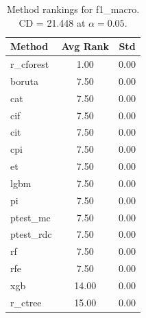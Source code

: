 \begin{table}[h]
\centering
\caption{Method rankings for f1_macro. CD = 21.448 at $\alpha=0.05$.}
\label{tab:ranks_f1_macro}
\begin{tabular}{lcc}
\toprule
Method & Avg Rank & Std \\
\midrule
r_cforest & 1.00 & 0.00 \\
boruta & 7.50 & 0.00 \\
cat & 7.50 & 0.00 \\
cif & 7.50 & 0.00 \\
cit & 7.50 & 0.00 \\
cpi & 7.50 & 0.00 \\
et & 7.50 & 0.00 \\
lgbm & 7.50 & 0.00 \\
pi & 7.50 & 0.00 \\
ptest_mc & 7.50 & 0.00 \\
ptest_rdc & 7.50 & 0.00 \\
rf & 7.50 & 0.00 \\
rfe & 7.50 & 0.00 \\
xgb & 14.00 & 0.00 \\
r_ctree & 15.00 & 0.00 \\
\bottomrule
\end{tabular}
\end{table}